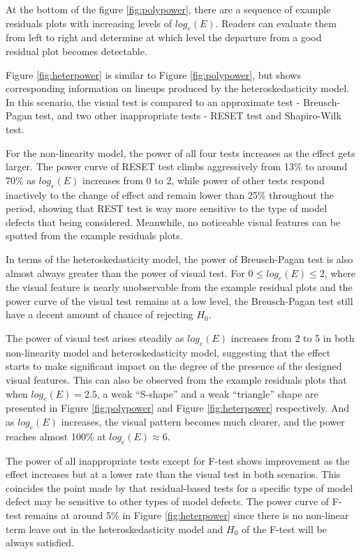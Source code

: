 \documentclass[]{interact}
\theoremstyle{plain}%
\theoremstyle{definition}
\theoremstyle{remark}
\begin{document}
At the bottom of the figure \ref{fig:polypower}, there are a sequence of
example residuals plots with increasing levels of \(log_e(E)\). Readers
can evaluate them from left to right and determine at which level the
departure from a good residual plot becomes detectable.

Figure \ref{fig:heterpower} is similar to Figure \ref{fig:polypower},
but shows corresponding information on lineups produced by the
heteroskedasticity model. In this scenario, the visual test is compared
to an approximate test - Breusch-Pagan test, and two other inappropriate
tests - RESET test and Shapiro-Wilk test.

For the non-linearity model, the power of all four tests increases as
the effect gets larger. The power curve of RESET test climbs
aggressively from 13\% to around 70\% as \(log_e(E)\) increases from 0
to 2, while power of other tests respond inactively to the change of
effect and remain lower than 25\% throughout the period, showing that
REST test is way more sensitive to the type of model defects that being
considered. Meanwhile, no noticeable visual features can be spotted from
the example residuals plots.

In terms of the heteroskedasticity model, the power of Breusch-Pagan
test is also almost always greater than the power of visual test. For
\(0 \leq log_e(E) \leq 2\), where the visual feature is nearly
unobservable from the example residual plots and the power curve of the
visual test remains at a low level, the Breusch-Pagan test still have a
decent amount of chance of rejecting \(H_0\).

The power of visual test arises steadily as \(log_e(E)\) increases from
2 to 5 in both non-linearity model and heteroskedasticity model,
suggesting that the effect starts to make significant impact on the
degree of the presence of the designed visual features. This can also be
observed from the example residuals plots that when \(log_e(E) = 2.5\),
a weak ``S-shape'' and a weak ``triangle'' shape are presented in Figure
\ref{fig:polypower} and Figure \ref{fig:heterpower} respectively. And as
\(log_e(E)\) increases, the visual pattern becomes much clearer, and the
power reaches almost 100\% at \(log_e(E) \approx 6\).

The power of all inappropriate tests except for F-test shows improvement
as the effect increases but at a lower rate than the visual test in both
scenarios. This coincides the point made by \citet{cook1982residuals}
that residual-based tests for a specific type of model defect may be
sensitive to other types of model defects. The power curve of F-test
remains at around 5\% in Figure \ref{fig:heterpower} since there is no
non-linear term leave out in the heteroskedasticity model and \(H_0\) of
the F-test will be always satisfied.
\end{document}
